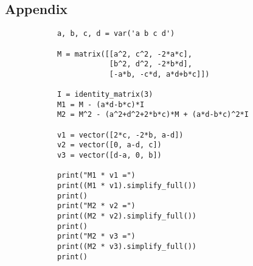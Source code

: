     \subsection{Appendix}
        \label{code:matrix_representation_of_dynamics_on_product_of_elliptic_curves}
        \begin{verbatim}
            a, b, c, d = var('a b c d')

            M = matrix([[a^2, c^2, -2*a*c],
                        [b^2, d^2, -2*b*d],
                        [-a*b, -c*d, a*d+b*c]])

            I = identity_matrix(3)
            M1 = M - (a*d-b*c)*I
            M2 = M^2 - (a^2+d^2+2*b*c)*M + (a*d-b*c)^2*I

            v1 = vector([2*c, -2*b, a-d])
            v2 = vector([0, a-d, c])
            v3 = vector([d-a, 0, b])

            print("M1 * v1 =")
            print((M1 * v1).simplify_full())
            print()
            print("M2 * v2 =")
            print((M2 * v2).simplify_full())
            print()
            print("M2 * v3 =")
            print((M2 * v3).simplify_full())
            print()
        \end{verbatim}

